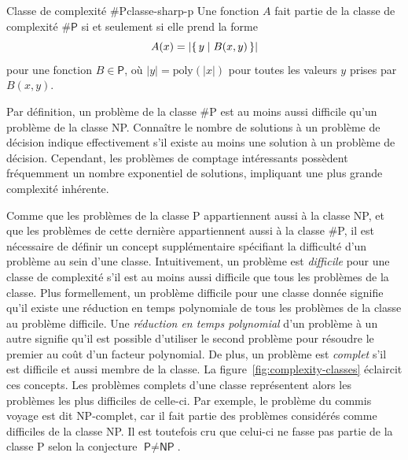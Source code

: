 \begin{maindefinition}{Classe de complexité \textsf{\#P}}{classe-sharp-p}
    Une fonction $A$ fait partie de la classe de complexité $\textsf{\#P}$ si et seulement si elle prend la forme
    \begin{equation*}
        A(x) = \lvert \set{ y \mid B(x, y)} \rvert
    \end{equation*}
    pour une fonction $B \in \textsf{P}$, où $\lvert y \rvert = \mathrm{poly}(\lvert x \rvert)$ pour toutes les valeurs $y$ prises par $B(x,y)$.
\end{maindefinition}

Par définition, un problème de la classe \textsf{\#P} est au moins aussi difficile qu'un problème de la classe \textsf{NP}. Connaître le nombre de solutions à un problème de décision indique effectivement s'il existe au moins une solution à un problème de décision. Cependant, les problèmes de comptage intéressants possèdent fréquemment un nombre exponentiel de solutions, impliquant une plus grande complexité inhérente.

Comme que les problèmes de la classe \textsf{P} appartiennent aussi à la classe \textsf{NP}, et que les problèmes de cette dernière appartiennent aussi à la classe \textsf{\#P}, il est nécessaire de définir un concept supplémentaire spécifiant la difficulté d'un problème au sein d'une classe. Intuitivement, un problème est \textit{difficile} pour une classe de complexité s'il est au moins aussi difficile que tous les problèmes de la classe. Plus formellement, un problème difficile pour une classe donnée signifie qu'il existe une réduction en temps polynomiale de tous les problèmes de la classe au problème difficile. Une \textit{réduction en temps polynomial} d'un problème à un autre signifie qu'il est possible d'utiliser le second problème pour résoudre le premier au coût d'un facteur polynomial. De plus, un problème est \textit{complet} s'il est difficile et aussi membre de la classe. La figure~\ref{fig:complexity-classes} éclaircit ces concepts. Les problèmes complets d'une classe représentent alors les problèmes les plus difficiles de celle-ci. Par exemple, le problème du commis voyage est dit \textsf{NP}-complet, car il fait partie des problèmes considérés comme difficiles de la classe \textsf{NP}. Il est toutefois cru que celui-ci ne fasse pas partie de la classe \textsf{P} selon la conjecture $\textsf{P} \neq \textsf{NP}$.

